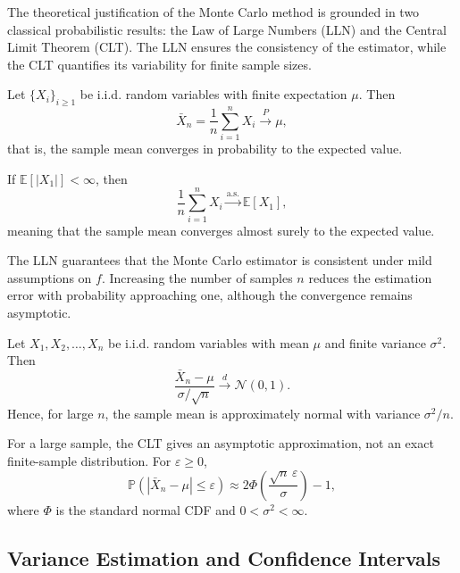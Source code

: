 The theoretical justification of the Monte Carlo method is grounded in two classical probabilistic results: the Law of Large Numbers (LLN) and the Central Limit Theorem (CLT). The LLN ensures the consistency of the estimator, while the CLT quantifies its variability for finite sample sizes.

\begin{theorem}
Let \( \{X_i\}_{i \ge 1} \) be i.i.d. random variables with finite expectation \( \mu \). Then
\[
\bar{X}_n = \frac{1}{n} \sum_{i=1}^n X_i \xrightarrow{P} \mu,
\]
that is, the sample mean converges in probability to the expected value.
\end{theorem}

\begin{theorem}
If \( \mathbb{E}[|X_1|] < \infty \), then
\[
\frac{1}{n} \sum_{i=1}^n X_i \xrightarrow{\text{a.s.}} \mathbb{E}[X_1],
\]
meaning that the sample mean converges almost surely to the expected value.
\end{theorem}

\begin{remark}
The LLN guarantees that the Monte Carlo estimator is consistent under mild assumptions on \( f \). Increasing the number of samples \( n \) reduces the estimation error with probability approaching one, although the convergence remains asymptotic.
\end{remark}

\begin{theorem}
Let \( X_1, X_2, \dots, X_n \) be i.i.d. random variables with mean \( \mu \) and finite variance \( \sigma^2 \). Then
\[
\frac{\bar{X}_n - \mu}{\sigma / \sqrt{n}} \xrightarrow{d} \mathcal{N}(0,1).
\]
Hence, for large \( n \), the sample mean is approximately normal with variance \( \sigma^2 / n \).
\end{theorem}

\begin{remark}
For a large sample, the CLT gives an asymptotic approximation,
not an exact finite-sample distribution. For $\varepsilon\ge0$,
\[
\mathbb P(|\bar X_n-\mu|\le\varepsilon)
\approx 2\Phi\!\left(\frac{\sqrt n\,\varepsilon}{\sigma}\right)-1,
\]
where $\Phi$ is the standard normal CDF and $0<\sigma^2<\infty$.
\end{remark}
\subsection{Variance Estimation and Confidence Intervals }

